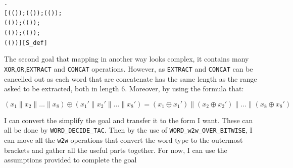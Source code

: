 \documentclass{article}
\begin{document}
\begin{alltt}
\HOLTokenTurnstile{} \HOLSymConst{\HOLTokenForall{}}.   \HOLSymConst{=}
         [ (( \HOLSymConst{\HOLTokenExtract{}} ) );  (( \HOLSymConst{\HOLTokenExtract{}} ) );  (( \HOLSymConst{\HOLTokenExtract{}} ) );
           (( \HOLSymConst{\HOLTokenExtract{}} ) );  (( \HOLSymConst{\HOLTokenExtract{}} ) );
           (( \HOLSymConst{\HOLTokenExtract{}} ) );  (( \HOLSymConst{\HOLTokenExtract{}} ) );
           (( \HOLSymConst{\HOLTokenExtract{}} ) )]\hfill{[S_def]}
\end{alltt}

The second goal that mapping in another way looks complex, it contains many \verb|XOR|,\verb|OR|,\verb|EXTRACT| and \verb|CONCAT|
operations. However, as \verb|EXTRACT| and \verb|CONCAT| can be cancelled out as each word that are concatenate has the same length as
the range asked to be extracted, both in length 6. Moreover, by using the formula that:

\begin{equation*}
(x_1 \parallel x_2 \parallel \dots \parallel x_8) \oplus (x_1' \parallel x_2' \parallel \dots \parallel x_8') = (x_1 \oplus x_1') \parallel (x_2 \oplus x_2') \parallel \dots \parallel (x_8 \oplus x_8')
\end{equation*}

I can convert the simplify the goal and transfer it to the form I want. These can all be done by \verb|WORD_DECIDE_TAC|. Then by the use
of \verb|WORD_w2w_OVER_BITWISE|, I can move all the \verb|w2w| operations that convert the word type to the outermost brackets and gather all the
useful parts together. For now, I can use the assumptions provided to complete the goal
\end{document}
